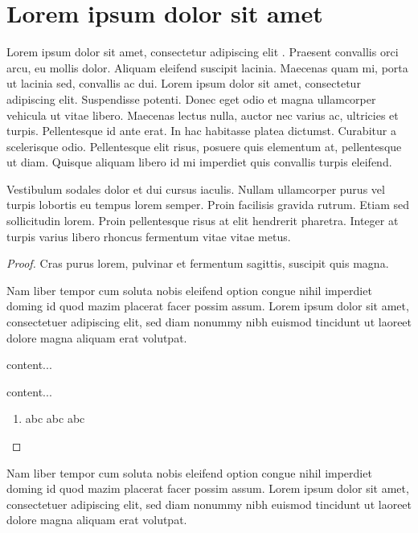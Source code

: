 \documentclass[a4paper,UKenglish,cleveref, autoref, thm-restate]{lipics-v2021}
\begin{document}
\section{Lorem ipsum dolor sit amet}

Lorem ipsum dolor sit amet, consectetur adipiscing elit \cite{DBLP:journals/cacm/Knuth74}. Praesent convallis orci arcu, eu mollis dolor. Aliquam eleifend suscipit lacinia. Maecenas quam mi, porta ut lacinia sed, convallis ac dui. Lorem ipsum dolor sit amet, consectetur adipiscing elit. Suspendisse potenti. Donec eget odio et magna ullamcorper vehicula ut vitae libero. Maecenas lectus nulla, auctor nec varius ac, ultricies et turpis. Pellentesque id ante erat. In hac habitasse platea dictumst. Curabitur a scelerisque odio. Pellentesque elit risus, posuere quis elementum at, pellentesque ut diam. Quisque aliquam libero id mi imperdiet quis convallis turpis eleifend.

\begin{lemma}
\label{lemma:lorem}
Vestibulum sodales dolor et dui cursus iaculis. Nullam ullamcorper purus vel turpis lobortis eu tempus lorem semper. Proin facilisis gravida rutrum. Etiam sed sollicitudin lorem. Proin pellentesque risus at elit hendrerit pharetra. Integer at turpis varius libero rhoncus fermentum vitae vitae metus.
\end{lemma}

\begin{proof}
Cras purus lorem, pulvinar et fermentum sagittis, suscipit quis magna.


Nam liber tempor cum soluta nobis eleifend option congue nihil imperdiet doming id quod mazim placerat facer possim assum. Lorem ipsum dolor sit amet, consectetuer adipiscing elit, sed diam nonummy nibh euismod tincidunt ut laoreet dolore magna aliquam erat volutpat.
\begin{claim}
content...
\end{claim}
\begin{claimproof}
content...
    \begin{enumerate}
        \item abc abc abc \claimqedhere{}
    \end{enumerate}
\end{claimproof}

\end{proof}

\begin{corollary}
\label{lemma:curabitur}
Nam liber tempor cum soluta nobis eleifend option congue nihil imperdiet doming id quod mazim placerat facer possim assum. Lorem ipsum dolor sit amet, consectetuer adipiscing elit, sed diam nonummy nibh euismod tincidunt ut laoreet dolore magna aliquam erat volutpat.
\end{corollary}
\end{document}
